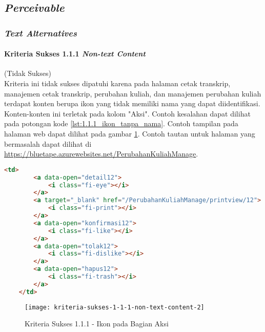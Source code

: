 \subsection{\textit{Perceivable}}
\label{subsec:kepatuhan_bluetape_perceivable}

\subsubsection{\textit{Text Alternatives}}
\label{subsubsec:kepatuhan_bluetape_text_alternatives}

\paragraph{Kriteria Sukses 1.1.1 \textit{Non-text Content}}
\label{par:kepatuhan_bluetape_kriteria_sukses_1.1.1}
(Tidak Sukses)\\

Kriteria ini tidak sukses dipatuhi karena pada halaman cetak transkrip, manajemen cetak transkrip, perubahan kuliah, dan manajemen perubahan kuliah terdapat konten berupa ikon yang tidak memiliki nama yang dapat diidentifikasi. Konten-konten ini terletak pada kolom "Aksi". Contoh kesalahan dapat dilihat pada potongan kode \ref{lst:1.1.1_ikon_tanpa_nama}. Contoh tampilan pada halaman web dapat dilihat pada gambar \ref{fig:1.1.1_non_text_content_2}. Contoh tautan untuk halaman yang bermasalah dapat dilihat di \url{https://bluetape.azurewebsites.net/PerubahanKuliahManage}.
\begin{lstlisting}[frame=single, label={lst:1.1.1_ikon_tanpa_nama}, language=HTML, caption=Kriteria Sukses 1.1.1 - Ikon Tanpa Nama]
    <td>
        <a data-open="detail12">
            <i class="fi-eye"></i>
        </a>
        <a target="_blank" href="/PerubahanKuliahManage/printview/12">
            <i class="fi-print"></i>
        </a>
        <a data-open="konfirmasi12">
            <i class="fi-like"></i>
        </a>  
        <a data-open="tolak12">
            <i class="fi-dislike"></i>
        </a>
        <a data-open="hapus12">
            <i class="fi-trash"></i>
        </a>
    </td>
\end{lstlisting}

\begin{figure}[H]
    \centering  
    \texttt{[image: kriteria-sukses-1-1-1-non-text-content-2]}  
    \caption[Kriteria Sukses 1.1.1 - Ikon pada Bagian Aksi]{Kriteria Sukses 1.1.1 - Ikon pada Bagian Aksi}
    \label{fig:1.1.1_non_text_content_2}  
\end{figure} 

